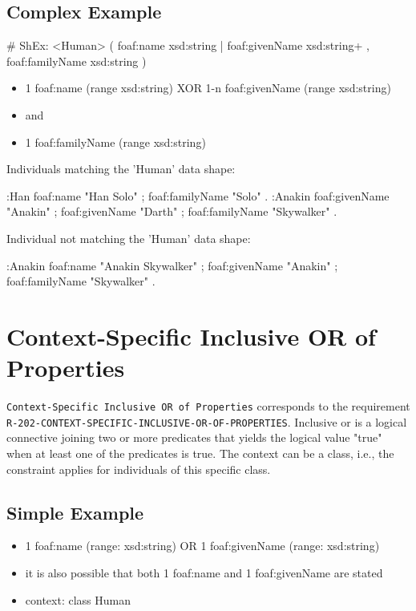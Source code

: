 \documentclass{llncs}
\newcommand{\ms}[1]{\texttt{#1}}
\begin{document}
\subsection{Complex Example}

\begin{ex}
# ShEx:
<Human> { (  
    foaf:name xsd:string | foaf:givenName xsd:string+ , 
    foaf:familyName xsd:string ) }
\end{ex}

\begin{itemize}
	\item 1 foaf:name (range xsd:string) XOR 1-n foaf:givenName (range xsd:string)
	\item and
	\item 1 foaf:familyName (range xsd:string)
\end{itemize}

Individuals matching the 'Human' data shape:

\begin{ex}
:Han
    foaf:name "Han Solo" ;
    foaf:familyName "Solo" .
:Anakin
    foaf:givenName "Anakin" ;
    foaf:givenName "Darth" ;
    foaf:familyName "Skywalker" .
\end{ex}

Individual not matching the 'Human' data shape:

\begin{ex}
:Anakin
    foaf:name "Anakin Skywalker" ;
    foaf:givenName "Anakin" ;
    foaf:familyName "Skywalker" .
\end{ex}

\section{Context-Specific Inclusive OR of Properties}

\ms{Context-Specific Inclusive OR of Properties} corresponds to the requirement
\ms{R-202-CONTEXT-SPECIFIC-INCLUSIVE-OR-OF-PROPERTIES}.
Inclusive or is a logical connective joining two or more predicates that yields the logical value "true" when at least one of the predicates is true.
The context can be a class, i.e., the constraint applies for individuals of this specific class.

\subsection{Simple Example}

\begin{itemize}
	\item 1 foaf:name (range: xsd:string) OR 1 foaf:givenName (range: xsd:string)
	\item it is also possible that both 1 foaf:name and 1 foaf:givenName are stated
	\item context: class Human
\end{itemize}
\end{document}

